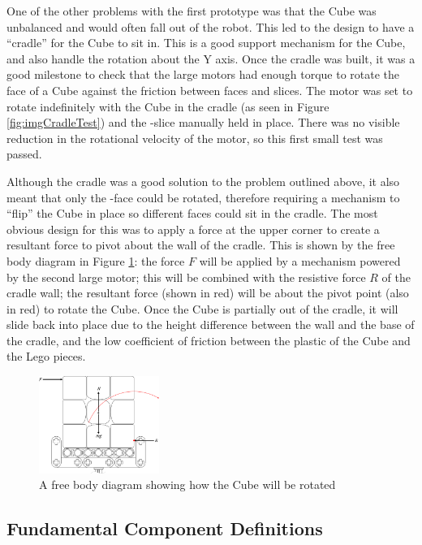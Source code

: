 \documentclass{report}
\newcommand{\face}[1]{\uppercase{\texttt{\formatmovesnospace{#1}}}-face}
\newcommand{\slice}[1]{\uppercase{\texttt{\formatmovesnospace{#1}}}-slice}
\begin{document}
	One of the other problems with the first prototype was that the Cube was unbalanced and would often fall out of the robot. This led to the design to have a \enquote{cradle} for the Cube to sit in. This is a good support mechanism for the Cube, and also handle the rotation about the Y axis. Once the cradle was built, it was a good milestone to check that the large motors had enough torque to rotate the face of a Cube against the friction between faces and slices. The motor was set to rotate indefinitely with the Cube in the cradle (as seen in Figure \ref{fig:imgCradleTest}) and the \slice{l-r} manually held in place. There was no visible reduction in the rotational velocity of the motor, so this first small test was passed.
	
	Although the cradle was a good solution to the problem outlined above, it also meant that only the \face{d} could be rotated, therefore requiring a mechanism to \enquote{flip} the Cube in place so different faces could sit in the cradle. The most obvious design for this was to apply a force at the upper corner to create a resultant force to pivot about the wall of the cradle. This is shown by the free body diagram in Figure \ref{fig:dwgCubeFreeBodyDiagram}: the force $F$ will be applied by a mechanism powered by the second large motor; this will be combined with the resistive force $R$ of the cradle wall; the resultant force (shown in red) will be about the pivot point (also in red) to rotate the Cube. Once the Cube is partially out of the cradle, it will slide back into place due to the height difference between the wall and the base of the cradle, and the low coefficient of friction between the plastic of the Cube and the Lego pieces.
    
	\begin{figure}[H]
    	\centering
   		\includegraphics[width=0.35\textwidth]{Resources/Images/dwgCubeFreeBodyDiagram.png}
   		\caption{A free body diagram showing how the Cube will be rotated}
   		\label{fig:dwgCubeFreeBodyDiagram}
    \end{figure}
    
    \subsection{Fundamental Component Definitions} \label{sec:componentDefinitions}
    
\end{document}
